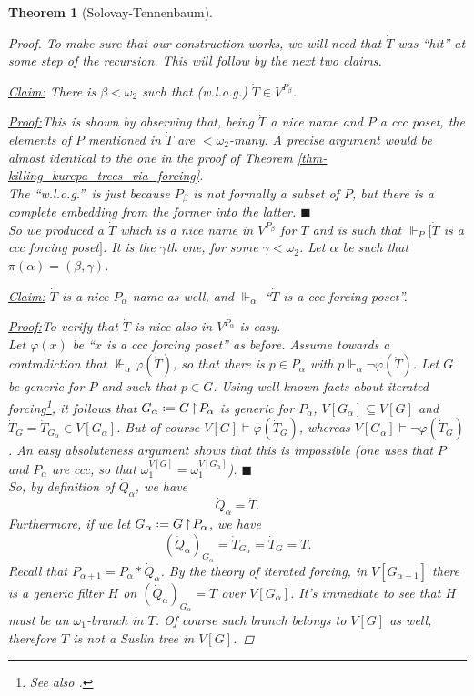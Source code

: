 \documentclass[11pt,a4paper]{report}
\newtheorem{theorem}{Theorem}[chapter] %
\theoremstyle{definition}
\theoremstyle{num.custom-title}
\theoremstyle{custom-title}
\newenvironment{claim}[1]{\par\noindent\underline{Claim#1:}\space}{} %
\newenvironment{claimproof}[1]{\par\noindent\underline{Proof:}\space#1}{\leavevmode\unskip\penalty9999 \hbox{}\nobreak\hfill\quad\hbox{$\blacksquare$}} %
\DeclareMathOperator{\sse}{\subseteq}
\DeclareMathOperator{\restr}{\upharpoonright}
\newcommand*{\defeq}{\mathrel{\rlap{%
                     \raisebox{0.3ex}{$\cdot$}}%
                     \raisebox{-0.3ex}{$\cdot$}}%
                     =}
\renewcommand{\phi}{\varphi}
\newcommand{\forces}{\Vdash}
\begin{document}
\begin{theorem}[Solovay-Tennenbaum]
\begin{proof}
To make sure that our construction works, we will need that $\dot{T}$ was ``hit'' at some step of the recursion. This will follow by the next two claims.
\\[-10pt]
\begin{claim}{}
There is $\beta < \omega_2$ such that (w.l.o.g.) $\dot{T} \in V^{P_\beta}$.
\begin{claimproof}
This is shown by observing that, being $\dot{T}$ a nice name and $P$ a ccc poset, the elements of $P$ mentioned in $\dot{T}$ are $<\omega_2$-many. A precise argument would be almost identical to the one in the proof of Theorem \ref{thm-killing_kurepa_trees_via_forcing}.\\
The ``w.l.o.g.''\ is just because $P_\beta$ is not formally a subset of $P$, but there is a complete embedding from the former into the latter.
\end{claimproof}
\end{claim}
\\[6pt]
So we produced a $\dot{T}$ which is a nice name in $V^{P_\beta}$ for $T$ and is such that $\forces_P [\dot{T}$ is a ccc forcing poset$]$. It is the $\gamma$th one, for some $\gamma < \omega_2$.  Let $\alpha$ be such that $\pi(\alpha) = (\beta,\gamma)$.
 \\[-10pt]
\begin{claim}{}
$\dot{T}$ is a nice $P_\alpha$-name as well, and $\forces_\alpha$ ``$\dot{T}$ is a ccc forcing poset''.
\begin{claimproof}
To verify that $\dot{T}$ is nice also in $V^{P_\alpha}$ is easy.\\
Let $\phi(x)$ be ``$x$ is a ccc forcing poset'' as before. Assume towards a contradiction that $\not\forces_\alpha \phi(\dot{T})$, so that there is $p \in P_\alpha$ with $p \forces_\alpha \neg\phi(\dot{T})$. Let $G$ be generic for $P$ and such that $p \in G$. Using well-known facts about iterated forcing\footnote{See also \cite[Lemma IV.4.2 and Lemma IV.4.4, pp.\ 270-71]{Kun2013}.}, it follows that $G_\alpha \defeq G \restr P_\alpha$ is generic for $P_\alpha$, $V[G_\alpha] \sse V[G]$ and $\dot{T}_G = \dot{T}_{G_\alpha} \in V[G_\alpha]$. But of course $V[G] \models \phi(\dot{T}_G)$, whereas $V[G_\alpha] \models \neg\phi(\dot{T}_G)$. An easy absoluteness argument shows that this is impossible (one uses that $P$ and $P_\alpha$ are ccc, so that $\omega_1^{V[G]} = \omega_1^{V[G_\alpha]}$).
\end{claimproof}
\end{claim}
\\[6pt]
So, by definition of $\dot{Q}_\alpha$, we have
\[
\dot{Q}_\alpha = \dot{T}.
\]
Furthermore, if we let $G_\alpha \defeq G \restr P_\alpha$, we have
\[
(\dot{Q}_\alpha)_{G_\alpha} = \dot{T}_{G_\alpha} = \dot{T}_G = T.
\]
Recall that $P_{\alpha+1} = P_\alpha * \dot{Q}_\alpha$. By the theory of iterated forcing, in $V[G_{\alpha+1}]$ there is a generic filter $H$ on $(\dot{Q}_\alpha)_{G_\alpha} = T$ over $V[G_\alpha]$. It's immediate to see that $H$ must be an $\omega_1$-branch in $T$. Of course such branch belongs to $V[G]$ as well, therefore $T$ is not a Suslin tree in $V[G]$.
\end{proof}
\end{theorem}
\end{document}
